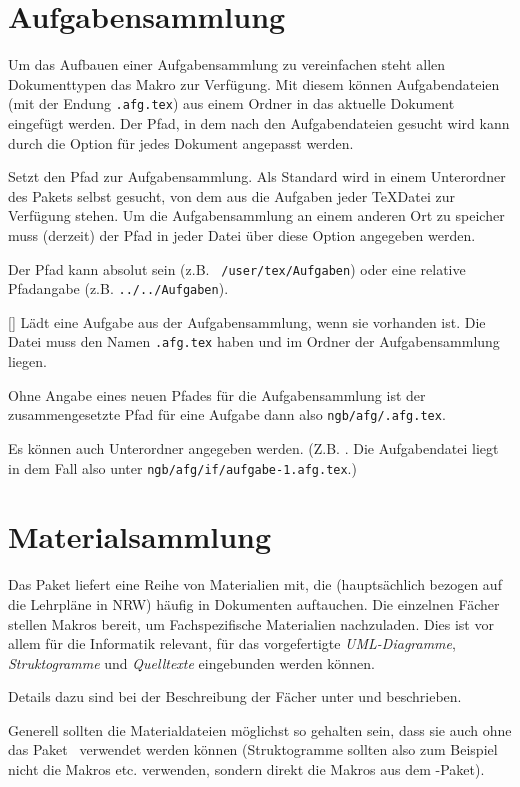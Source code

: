 \section{Aufgabensammlung}\label{sec:aufgabensammlung}
Um das Aufbauen einer Aufgabensammlung zu vereinfachen steht allen Dokumenttypen das Makro  zur Verfügung. Mit diesem können Aufgabendateien (mit der Endung \texttt{.afg.tex}) aus einem Ordner in das aktuelle Dokument eingefügt werden. Der Pfad, in dem nach den Aufgabendateien gesucht wird kann durch die Option  für jedes Dokument angepasst werden.

\begin{options}
	Setzt den Pfad zur Aufgabensammlung. Als Standard wird in einem Unterordner des Pakets selbst gesucht, von dem aus die Aufgaben jeder \TeX Datei zur Verfügung stehen. Um die Aufgabensammlung an einem anderen Ort zu speicher muss (derzeit) der Pfad in jeder Datei über diese Option angegeben werden.
	
	Der Pfad kann absolut sein (z.B. \texttt{~/user/tex/Aufgaben}) oder eine relative Pfadangabe (z.B. \texttt{../../Aufgaben}).
\end{options}

\begin{commands}
	[]
	Lädt eine Aufgabe aus der Aufgabensammlung, wenn sie vorhanden ist. Die Datei muss den Namen \texttt{.afg.tex} haben und im Ordner der Aufgabensammlung liegen.
	
	Ohne Angabe eines neuen Pfades für die Aufgabensammlung
	ist der zusammengesetzte Pfad für eine Aufgabe dann also
	\texttt{ngb/afg/.afg.tex}.
	
	Es können auch Unterordner angegeben werden. (Z.B. . Die
	Aufgabendatei liegt in dem Fall also unter \texttt{ngb/afg/if/aufgabe-1.afg.tex}.)
\end{commands}


\section{Materialsammlung}\label{sec:materialsammlung}
Das Paket liefert eine Reihe von Materialien mit, die (hauptsächlich bezogen auf die Lehrpläne in NRW) häufig in Dokumenten auftauchen. Die einzelnen Fächer stellen Makros bereit, um Fachspezifische Materialien nachzuladen. Dies ist vor allem für die Informatik relevant, für das vorgefertigte \emph{UML-Diagramme}, \emph{Struktogramme} und \emph{Quelltexte} eingebunden werden können.

Details dazu sind bei der Beschreibung der Fächer unter  und  beschrieben.

Generell sollten die Materialdateien möglichst so gehalten sein, dass sie auch ohne das Paket \ngbschule\ verwendet werden können (Struktogramme sollten also zum Beispiel nicht die Makros  etc. verwenden, sondern direkt die Makros aus dem -Paket).